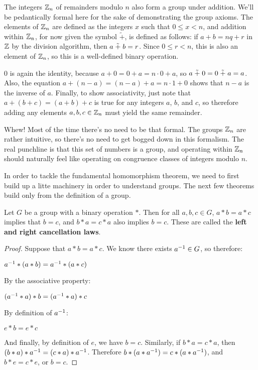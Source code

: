\begin{example}
The integers $\zn[n]$ of remainders modulo $n$ also form a group under addition. We'll be pedantically formal here for the sake of demonstrating the group axioms. The elements of $\zn[n]$ are defined as the integers $x$ such that $0 \leq x < n$, and addition within $\zn[n]$, for now given the symbol $\tilde +$, is defined as follows: if $a + b = nq + r$ in $\z$ by the division algorithm, then $a \np b = r$. Since $0 \leq r < n$, this is also an element of $\zn[n]$, so this is a well-defined binary operation.

$0$ is again the identity, because $a + 0 = 0 + a = n\cdot 0 + a$, so $a \np 0 = 0 \np a = a$. Also, the equation $a + (n-a) = (n-a) + a = n\cdot 1 + 0$ shows that $n-a$ is the inverse of $a$. Finally, to show associativity, just note that $a + (b + c) = (a + b) + c$ is true for any integers $a$, $b$, and $c$, so therefore adding any elements $a, b, c \in \zn[n]$ must yield the same remainder.
\end{example}

Whew! Most of the time there's no need to be that formal. The groups $\zn[n]$ are rather intuitive, so there's no need to get bogged down in this formalism. The real punchline is that this set of numbers is a group, and operating within $\zn[n]$ should naturally feel like operating on congruence classes of integers modulo $n$.

In order to tackle the fundamental homomorphism theorem, we need to first build up a litte machinery in order to understand groups. The next few theorems build only from the definition of a group.

\begin{theorem}
Let $G$ be a group with a binary operation $*$. Then for all $a, b, c \in G$, $a * b = a * c$ implies that $b = c$, and $b*a = c*a$ also implies $b=c$. These are called the \textbf{left and right cancellation laws}.
\end{theorem}

\begin{proof}
Suppose that $a*b = a*c$. We know there exists $\inv{a} \in G$, so therefore:

\begin{center}
    $\inv{a} * (a*b) = \inv{a} * (a*c)$
\end{center}

By the associative property:

\begin{center}
    $(\inv{a} * a) * b = (\inv{a} * a) * c$
\end{center}

By definition of $\inv{a}$:

\begin{center}
    $e * b = e * c$
\end{center}

And finally, by definition of $e$, we have $b = c$. Similarly, if $b*a = c*a$, then $(b*a)*\inv{a} = (c*a)*\inv{a}$. Therefore $b*(a*\inv{a}) = c*(a*\inv{a})$, and $b*e = c*e$, or $b = c$.

\end{proof}

